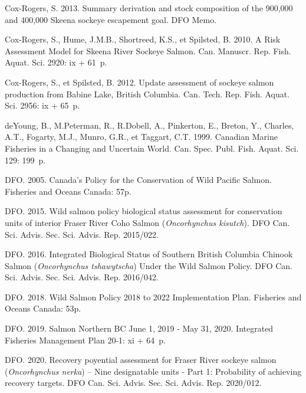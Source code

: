 \documentclass[french,11pt]{book}
\begin{document}
\begin{CSLReferences}{1}{0}
Cox-Rogers, S. 2013. {Summary derivation and stock composition of the 900,000 and 400,000 Skeena sockeye escapement goal}. DFO Memo.

Cox-Rogers, S., Hume, J.M.B., Shortreed, K.S., et Spilsted, B. 2010. {A Risk Assessment Model for Skeena River Sockeye Salmon}. Can. Manuscr. Rep. Fish. Aquat. Sci. 2920: ix + 61~p.

Cox-Rogers, S., et Spilsted, B. 2012. {Update assessment of sockeye salmon production from Babine Lake, British Columbia}. {Can. Tech. Rep. Fish. Aquat. Sci.} 2956: ix + 65~p.

deYoung, B., M.Peterman, R., R.Dobell, A., Pinkerton, E., Breton, Y., Charles, A.T., Fogarty, M.J., Munro, G.R., et Taggart, C.T. 1999. {Canadian Marine Fisheries in a Changing and Uncertain World}. Can. Spec. Publ. Fish. Aquat. Sci. 129: 199~p.

DFO. 2005. Canada's {Policy for the Conservation of Wild Pacific Salmon}. {Fisheries and Oceans Canada}: 57p.

DFO. 2015. {Wild salmon policy biological status assessment for conservation units of interior Fraser River Coho Salmon (}{\emph{Oncorhynchus kisutch}}{)}. DFO Can. Sci. Advis. Sec. Sci. Advis. Rep. 2015/022.

DFO. 2016. {Integrated Biological Status of Southern British Columbia Chinook Salmon (}{\emph{Oncorhynchus tshawytscha}}{) Under the Wild Salmon Policy}. DFO Can. Sci. Advis. Sec. Sci. Advis. Rep. 2016/042.

DFO. 2018. Wild Salmon Policy 2018 to 2022 Implementation Plan. {Fisheries and Oceans Canada}: 53p.

DFO. 2019. {Salmon Northern BC June 1, 2019 - May 31, 2020.} Integrated Fisheries Management Plan 20-1: xi + 64~p.

DFO. 2020. {Recovery poyential assessment for Fraser River sockeye salmon (}\emph{Oncorhynchus nerka}{) -- Nine designatable units - Part 1: Probability of achieving recovery targets}. DFO Can. Sci. Advis. Sec. Sci. Advis. Rep. 2020/012.


\end{CSLReferences}
\end{document}
